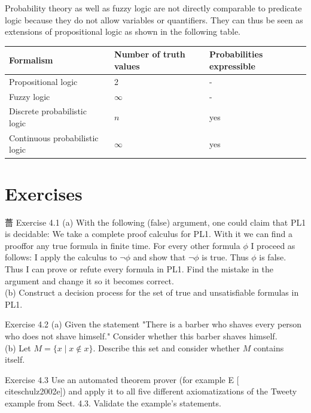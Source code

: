 \documentclass[10pt]{book}
\begin{document}
Probability theory as well as fuzzy logic are not directly comparable to predicate logic because they do not allow variables or quantifiers. They can thus be seen as extensions of propositional logic as shown in the following table.

\begin{center}
\begin{tabular}{|l|l|l|}
\hline
Formalism & Number of truth values & Probabilities expressible \\
\hline
Propositional logic & 2 & - \\
\hline
Fuzzy logic & $\infty$ & - \\
\hline
Discrete probabilistic logic & $n$ & yes \\
\hline
Continuous probabilistic logic & $\infty$ & yes \\

\hline
\end{tabular}
\end{center}

\section{Exercises}
薔 Exercise 4.1
(a) With the following (false) argument, one could claim that PL1 is decidable: We take a complete proof calculus for PL1. With it we can find a prooffor any true formula in finite time. For every other formula $\phi$ I proceed as follows: I apply the calculus to $\neg \phi$ and show that $\neg \phi$ is true. Thus $\phi$ is false. Thus I can prove or refute every formula in PL1. Find the mistake in the argument and change it so it becomes correct.\\
(b) Construct a decision process for the set of true and unsatisfiable formulas in PL1.

Exercise 4.2
(a) Given the statement "There is a barber who shaves every person who does not shave himself." Consider whether this barber shaves himself.\\
(b) Let $M=\{x \mid x \notin x\}$. Describe this set and consider whether $M$ contains itself.

Exercise 4.3 Use an automated theorem prover (for example E [\\cite{schulz2002e}]) and apply it to all five different axiomatizations of the Tweety example from Sect. 4.3. Validate the example's statements.
\end{document}
